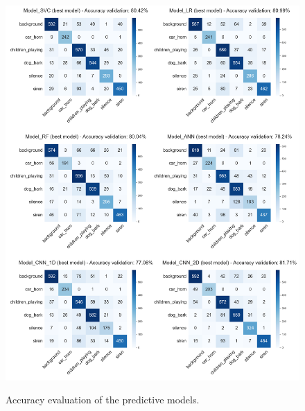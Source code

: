\begin{figure}[htbp]
    \raggedright
        \caption{Accuracy evaluation of the predictive models.}
        \includegraphics[width=1\textwidth]{resources/images/060-results/Results_classification_overview_models_evaluation_1.png}
        \label{fig:Results_models_evaluation}
\end{figure}

